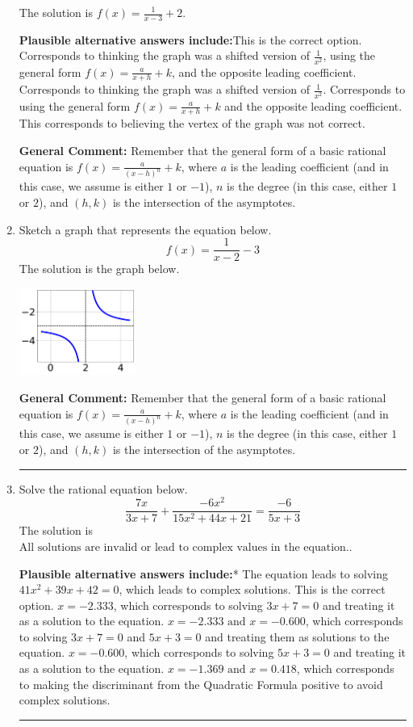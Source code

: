 \documentclass{extbook}[14pt]
\newcommand{\litem}[1]{\item #1

\rule{\textwidth}{0.4pt}}
\begin{document}
\begin{enumerate}
{The solution is \( f(x) = \frac{1}{x - 3} + 2 \).\begin{enumerate}[label=\Alph*.]
\textbf{Plausible alternative answers include:}This is the correct option.
Corresponds to thinking the graph was a shifted version of $\frac{1}{x^2}$, using the general form $f(x) = \frac{a}{x+h}+k$, and the opposite leading coefficient.
Corresponds to thinking the graph was a shifted version of $\frac{1}{x^2}$.
Corresponds to using the general form $f(x) = \frac{a}{x+h}+k$ and the opposite leading coefficient.
This corresponds to believing the vertex of the graph was not correct.
\end{enumerate}

\textbf{General Comment:} Remember that the general form of a basic rational equation is $ f(x) = \frac{a}{(x-h)^n} + k$, where $a$ is the leading coefficient (and in this case, we assume is either $1$ or $-1$), $n$ is the degree (in this case, either $1$ or $2$), and $(h, k)$ is the intersection of the asymptotes.
}
\litem{
Sketch a graph that represents the equation below.
\[ f(x) = \frac{1}{x - 2} - 3 \]The solution is the graph below.
    \begin{center}
        \includegraphics[width=0.3\textwidth]{../Figures/rationalEquationToGraphCopyAB.png}
    \end{center}

\textbf{General Comment:} Remember that the general form of a basic rational equation is $ f(x) = \frac{a}{(x-h)^n} + k$, where $a$ is the leading coefficient (and in this case, we assume is either $1$ or $-1$), $n$ is the degree (in this case, either $1$ or $2$), and $(h, k)$ is the intersection of the asymptotes.
}
\litem{
Solve the rational equation below.
\[ \frac{7x}{3x + 7} + \frac{-6x^{2}}{15x^{2} +44 x + 21} = \frac{-6}{5x + 3} \]The solution is \( \text{All solutions are invalid or lead to complex values in the equation.} \).\begin{enumerate}[label=\Alph*.]
\textbf{Plausible alternative answers include:}* The equation leads to solving $41x^{2} +39 x + 42=0$, which leads to complex solutions. This is the correct option.
$x = -2.333$, which corresponds to solving $3x + 7 = 0$ and treating it as a solution to the equation.
$x = -2.333 \text{ and } x = -0.600$, which corresponds to solving $3x + 7 = 0$ and $5x + 3 = 0$ and treating them as solutions to the equation.
$x = -0.600$, which corresponds to solving $5x + 3 = 0$ and treating it as a solution to the equation.
$x = -1.369 \text{ and } x = 0.418$, which corresponds to making the discriminant from the Quadratic Formula positive to avoid complex solutions.
\end{enumerate}

}
\end{enumerate}
\end{document}
